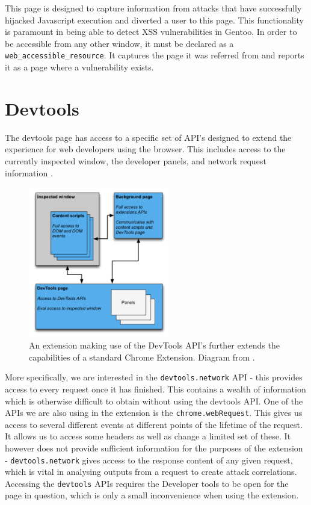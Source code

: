 This page is designed to capture information from attacks that have successfully hijacked Javascript execution and diverted a user to this page. This functionality is paramount in being able to detect XSS vulnerabilities in Gentoo. In order to be accessible from any other window, it must be declared as a \texttt{web\_accessible\_resource}. It captures the page it was referred from and reports it as a page where a vulnerability exists.

\section{Devtools} \label{devtools}

The devtools page has access to a specific set of API's designed to extend the experience for web developers using the browser. This includes access to the currently inspected window, the developer panels, and network request information \cite{chromeExtensionDevTools}. \\

\begin{figure}[h]
	\centering
	\includegraphics[width=0.55\textwidth]{images/devtools-extension.png}
	\caption{An extension making use of the DevTools API's further extends the capabilities of a standard Chrome Extension. Diagram from \cite{chromeExtensionDevTools}.}
	\label{fig:devtools_extension}
\end{figure}

More specifically, we are interested in the \texttt{devtools.network} API - this provides access to every request once it has finished. This contains a wealth of information which is otherwise difficult to obtain without using the devtools API. One of the APIs we are also using in the extension is the \texttt{chrome.webRequest}. This gives us access to several different events at different points of the lifetime of the request. It allows us to access some headers as well as change a limited set of these. It however does not provide sufficient information for the purposes of the extension - \texttt{devtools.network} gives access to the response content of any given request, which is vital in analysing outputs from a request to create attack correlations. Accessing the \texttt{devtools} APIs requires the Developer tools to be open for the page in question, which is only a small inconvenience when using the extension.

